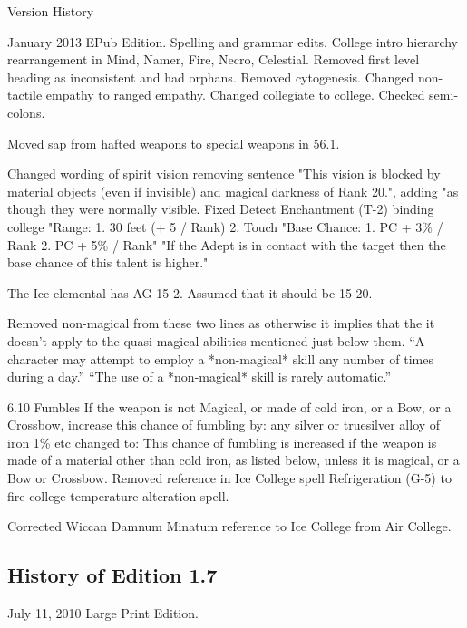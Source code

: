 \begin{Chapter}{Version History}
\begin{Description}

\item[January 2013] EPub Edition. Spelling and grammar edits.  College
  intro hierarchy rearrangement in Mind, Namer, Fire, Necro,
  Celestial. Removed first level heading as inconsistent and had
  orphans.  Removed cytogenesis.  Changed non-tactile empathy to
  ranged empathy.  Changed collegiate to college. Checked semi-colons.

Moved sap from hafted weapons to special weapons in 56.1.

Changed wording of spirit vision removing sentence "This vision is
blocked by material objects (even if invisible) and magical darkness
of Rank 20.", adding "as though they were normally visible.  Fixed
Detect Enchantment (T-2) binding college "Range: 1.  30 feet (+ 5 /
Rank) 2.  Touch "Base Chance: 1. PC + 3\% / Rank 2. PC + 5\% / Rank"
"If the Adept is in contact with the target then the base chance of
this talent is higher."

The Ice elemental has AG 15-2.  Assumed that it should be 15-20.

Removed non-magical from these two lines as otherwise it implies that
the it doesn't apply to the quasi-magical abilities mentioned just
below them.  “A character may attempt to employ a *non-magical* skill
any number of times during a day.”  “The use of a *non-magical* skill
is rarely automatic.”

6.10 Fumbles If the weapon is not Magical, or made of cold iron, or a
Bow, or a Crossbow, increase this chance of fumbling by: any silver or
truesilver alloy of iron 1\% etc changed to: This chance of fumbling
is increased if the weapon is made of a material other than cold iron,
as listed below, unless it is magical, or a Bow or Crossbow.  Removed
reference in Ice College spell Refrigeration (G-5) to fire college
temperature alteration spell.

Corrected Wiccan Damnum Minatum reference to Ice College from Air
College.
\end{Description}

\subsection{History of Edition 1.7}

\begin{Description}

\item[July 11, 2010] Large Print Edition. 


\end{Description}
\end{Chapter}
